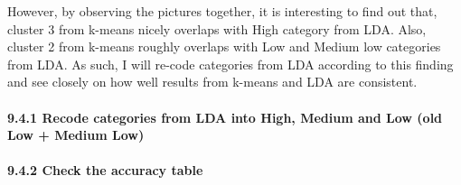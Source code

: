 \documentclass[
]{article}
\newenvironment{Shaded}{\begin{snugshade}}{\end{snugshade}}
\newcommand{\AttributeTok}[1]{\textcolor[rgb]{0.77,0.63,0.00}{#1}}
\newcommand{\FunctionTok}[1]{\textcolor[rgb]{0.00,0.00,0.00}{#1}}
\newcommand{\NormalTok}[1]{#1}
\newcommand{\OtherTok}[1]{\textcolor[rgb]{0.56,0.35,0.01}{#1}}
\newcommand{\SpecialCharTok}[1]{\textcolor[rgb]{0.00,0.00,0.00}{#1}}
\newcommand{\StringTok}[1]{\textcolor[rgb]{0.31,0.60,0.02}{#1}}
\begin{document}
However, by observing the pictures together, it is interesting to find
out that, cluster 3 from k-means nicely overlaps with High category from
LDA. Also, cluster 2 from k-means roughly overlaps with Low and Medium
low categories from LDA. As such, I will re-code categories from LDA
according to this finding and see closely on how well results from
k-means and LDA are consistent.

\hypertarget{recode-categories-from-lda-into-high-medium-and-low-old-low-medium-low}{%
\paragraph{9.4.1 Recode categories from LDA into High, Medium and Low
(old Low + Medium
Low)}\label{recode-categories-from-lda-into-high-medium-and-low-old-low-medium-low}}

\begin{Shaded}
\end{Shaded}

\hypertarget{check-the-accuracy-table}{%
\paragraph{9.4.2 Check the accuracy
table}\label{check-the-accuracy-table}}

\begin{Shaded}
\end{Shaded}
\end{document}
